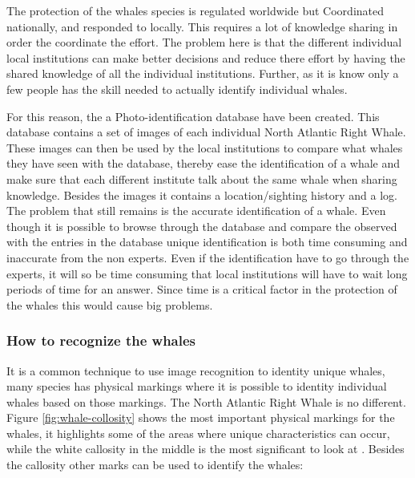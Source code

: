 The protection of the whales species is regulated worldwide but Coordinated nationally, and responded to locally. This requires a lot of knowledge sharing in order the coordinate the effort. The problem here is that the different individual local institutions can make better decisions and reduce there effort by having the shared knowledge of all the individual institutions.
Further, as it is know only a few people has the skill needed to actually identify individual whales.

For this reason, the a Photo-identification database have been created. This database contains a set of images of each individual North Atlantic Right Whale. 
These images can then be used by the local institutions to compare what whales they have seen with the database, thereby ease the identification of a whale and make sure that each different institute talk about the same whale when sharing knowledge. Besides the images it contains a location/sighting history and a log.
The problem that still remains is the accurate identification of a whale. Even though it is possible to browse through the database and compare the observed with the entries in the database unique identification is both time consuming and inaccurate from the non experts.
Even if the identification have to go through the experts, it will so be time consuming that local institutions will have to wait long periods of time for an answer.
Since time is a critical factor in the protection of the whales this would cause big problems.

\subsubsection{How to recognize the whales}
It is a common technique to use image recognition to identity unique whales, many species has physical markings where it is possible to identity individual whales based on those markings. The North Atlantic Right Whale is no different. Figure \ref{fig:whale-collosity} shows the most important physical markings for the whales, it highlights some of the areas where unique characteristics can occur, while the white callosity in the middle is the most significant to look at \cite{neaq:whale-identity}. Besides the callosity other marks can be used to identify the whales:

